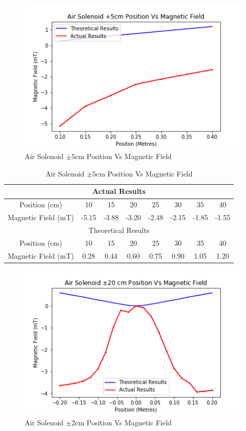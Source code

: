 \documentclass[12pt]{article}
\begin{document}
\begin{figure}[H]
\centering
\includegraphics[scale=0.7]{Images/Air_Solenoid/Air_Solenoid_Position_Vs_Magnetic_Field.png}
\caption{Air Solenoid $\pm5$cm Position Vs Magnetic Field}
\label{Air Solenoid Position Vs Magnetic Field Graph}
\end{figure}

\begin{table}[H]
\begin{center}
 \begin{tabular}{|c||c|c|c|c|c|c|c|}
  \hline
  \multicolumn{8}{|c|}{Actual Results} \\
  \hline
  \hline
  Position (cm)  & 10 & 15 & 20 & 25 & 30 & 35 & 40 \\
  \hline
  Magnetic Field (mT) & -5.15 & -3.88 & -3.20 & -2.48 & -2.15 & -1.85 & -1.55 \\
  \hline
  \hline
  \multicolumn{8}{|c|}{Theoretical Results} \\
  \hline
  Position (cm)  & 10 & 15 & 20 & 25 & 30 & 35 & 40 \\
  \hline
  Magnetic Field (mT) & 0.28 & 0.44 & 0.60 & 0.75 & 0.90 & 1.05 & 1.20 \\
  \hline
 \end{tabular}
 \caption{Air Solenoid $\pm5$cm Position Vs Magnetic Field}
 \label{Air Solenoid 5 Position Vs Magnetic Field Table}
\end{center}
\end{table}

\begin{figure}[H]
\centering
\includegraphics[scale=0.7]{Images/Air_Solenoid/Air_Solenoid_20_Position_Vs_Magnetic_Field.png}
 \caption{Air Solenoid $\pm2$cm Position Vs Magnetic Field}
 \label{Air Solenoid 20 Position Vs Magnetic Field graph}
\end{figure}
\end{document}
